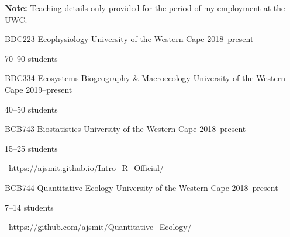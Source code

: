


\textbf{Note:} Teaching details only provided for the period of my employment at the UWC.

\begin{cventries}


\cventry
{BDC223} %
{Ecophysiology} %
{University of the Western Cape} %
{2018--present} %
{ %
\begin{cvitems}
\item {70--90 students}
\end{cvitems} 
}


\cventry
{BDC334} %
{Ecosystems Biogeography \& Macroecology} %
{University of the Western Cape} %
{2019--present} %
{ %
\begin{cvitems}
\item {40--50 students}
\end{cvitems} 
}


\cventry
{BCB743} %
{Biostatistics} %
{University of the Western Cape} %
{2018--present} %
{ %
\begin{cvitems}
\item {15--25 students}
\item {}~\url{https://ajsmit.github.io/Intro_R_Official/}
\end{cvitems} 
}


\cventry
{BCB744} %
{Quantitative Ecology} %
{University of the Western Cape} %
{2018--present} %
{ %
\begin{cvitems}
\item {7--14 students}
\item {}~\url{https://github.com/ajsmit/Quantitative_Ecology/}
\end{cvitems} 
}




\end{cventries}